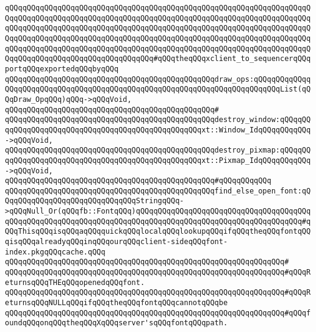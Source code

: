 \verb|qQQqqQQqqQQqqQQqqQQqqQQqqQQqqQQqqQQqqQQqqQQqqQQqqQQqqQQqqQQqqQQqqQQqqQQqqQQqqQQqqQQqqQQqqQQqqQQqqQQqqQQqqQQqqQQqqQQqqQQqqQQqqQQqqQQqqQQqqQQqqQQqqQQqqQQqqQQqqQQqqQQqqQQqqQQqqQQqqQQqqQQqqQQqqQQqqQQqqQQqqQQqqQQqqQQqqQQqqQQqqQQqqQQqqQQqqQQqqQQqqQQqqQQqqQQqqQQqqQQqqQQqqQQqqQQqqQQqqQQqqQQqqQQqqQQqqQQqqQQqqQQqqQQqqQQqqQQqqQQqqQQqqQQqqQQqqQQqqQQqqQQqqQQqqQQqqQQqqQQqqQQqqQQqqQQqqQQqqQQqqQQq#qQQqtheqQQqxclient_to_sequencerqQQqportqQQqexportedqQQqbyqQQq|\newline
\verb|qQQqqQQqqQQqqQQqqQQqqQQqqQQqqQQqqQQqqQQqqQQqqQQqdraw_ops:qQQqqQQqqQQqqQQqqQQqqQQqqQQqqQQqqQQqqQQqqQQqqQQqqQQqqQQqqQQqqQQqqQQqqQQqqQQqList(qQQqDraw_OpqQQq)qQQq->qQQqVoid,|\newline
\verb|qQQqqQQqqQQqqQQqqQQqqQQqqQQqqQQqqQQqqQQqqQQqqQQq#|\newline
\verb|qQQqqQQqqQQqqQQqqQQqqQQqqQQqqQQqqQQqqQQqqQQqqQQqdestroy_window:qQQqqQQqqQQqqQQqqQQqqQQqqQQqqQQqqQQqqQQqqQQqqQQqqQQqxt::Window_IdqQQqqQQqqQQq->qQQqVoid,|\newline
\verb|qQQqqQQqqQQqqQQqqQQqqQQqqQQqqQQqqQQqqQQqqQQqqQQqdestroy_pixmap:qQQqqQQqqQQqqQQqqQQqqQQqqQQqqQQqqQQqqQQqqQQqqQQqqQQqxt::Pixmap_IdqQQqqQQqqQQq->qQQqVoid,|\newline
\verb|qQQqqQQqqQQqqQQqqQQqqQQqqQQqqQQqqQQqqQQqqQQqqQQq#qQQqqQQqqQQq|\newline
\verb|qQQqqQQqqQQqqQQqqQQqqQQqqQQqqQQqqQQqqQQqqQQqqQQqfind_else_open_font:qQQqqQQqqQQqqQQqqQQqqQQqqQQqqQQqStringqQQq->qQQqNull_Or(qQQqfb::FontqQQq)qQQqqQQqqQQqqQQqqQQqqQQqqQQqqQQqqQQqqQQqqQQqqQQqqQQqqQQqqQQqqQQqqQQqqQQqqQQqqQQqqQQqqQQqqQQqqQQqqQQqqQQqqQQq#qQQqThisqQQqisqQQqaqQQqquickqQQqlocalqQQqlookupqQQqifqQQqtheqQQqfontqQQqisqQQqalreadyqQQqinqQQqourqQQqclient-sideqQQqfont-index.pkgqQQqcache.qQQq|\newline
\verb|qQQqqQQqqQQqqQQqqQQqqQQqqQQqqQQqqQQqqQQqqQQqqQQqqQQqqQQqqQQqqQQq#|\newline
\verb|qQQqqQQqqQQqqQQqqQQqqQQqqQQqqQQqqQQqqQQqqQQqqQQqqQQqqQQqqQQqqQQq#qQQqReturnsqQQqTHEqQQqopenedqQQqfont.|\newline
\verb|qQQqqQQqqQQqqQQqqQQqqQQqqQQqqQQqqQQqqQQqqQQqqQQqqQQqqQQqqQQqqQQq#qQQqReturnsqQQqNULLqQQqifqQQqtheqQQqfontqQQqcannotqQQqbe|\newline
\verb|qQQqqQQqqQQqqQQqqQQqqQQqqQQqqQQqqQQqqQQqqQQqqQQqqQQqqQQqqQQqqQQq#qQQqfoundqQQqonqQQqtheqQQqXqQQqserver'sqQQqfontqQQqpath.|\newline
\newline
